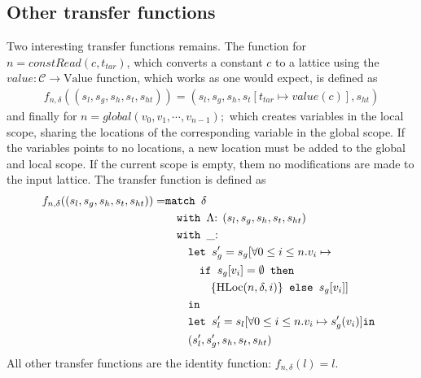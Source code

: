 \subsection{Other transfer functions}
Two interesting transfer functions remains. The function for $n = \mathit{constRead}(c, t_{tar})$, which converts a constant $c$ to a lattice using the $value : \mathcal{C} \rightarrow \text{Value}$ function, which works as one would expect, is defined as
\begin{align}
f_{n,\delta}((s_l, s_g, s_h, s_t,s_{ht})) = (s_l, s_g, s_h, s_t[t_{tar} \mapsto value(c)], s_{ht})
\end{align}
and finally for $n = global(v_0, v_1, \cdots, v_{n-1});$ which creates variables in the local scope, sharing the locations of the corresponding variable in the global scope. If the variables points to no locations, a new location must be added to the global and local scope. If the current scope is empty, them no modifications are made to the input lattice. The transfer function is defined as
\begin{align}
f_{n, \delta} ((s_l,s_g,s_h,s_t, s_{ht})) =     &\texttt{match }\delta\notag\\
                                                &\quad\texttt{with }\Lambda\text{: }(s_l,s_g,s_h,s_t, s_{ht})\notag\\
                                                &\quad\texttt{with }\_\text{: }\notag\\
                                                &\quad\quad\texttt{let } s_g' = s_g[\forall 0\leq i \leq n. v_i\mapsto \notag\\                                                
                                                &\quad\quad\quad\texttt{if }s_g[v_i] = \emptyset\texttt{ then } \notag\\
                                                &\quad\quad\quad\quad\{\text{HLoc}(n, \delta, i)\} \texttt{ else } s_g[v_i]]\notag\\
                                                &\quad\quad \texttt{in } \notag\\
                                                &\quad\quad\texttt{let } s_l'=s_l[\forall 0\leq i \leq n. v_i\mapsto s_g'(v_i)] \texttt{in }\notag\\
                                                &\quad\quad(s_l',s_g',s_h,s_t, s_{ht})
\end{align}
All other transfer functions are the identity function: $f_{n,\delta}(l) = l$.

